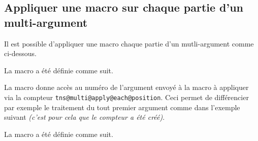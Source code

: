 \documentclass[12pt,a4paper]{article}
\begin{document}

\subsection{Appliquer une macro sur chaque partie d'un \og multi-argument \fg}


Il est possible d'appliquer une macro chaque partie d'un mutli-argument comme ci-dessous.

\makeatletter
\newcommand\decoone[1]{%
    [(\textbf{#1})] \quad%
}

\newcommand\multiapply[1]{%
    \tns@multi@apply@each{\decoone}{#1}
}
\makeatother

\begin{latexex}
\multiapply{1|2|3}
\end{latexex}

La macro  a été définie comme suit.

\begin{latexex-alone}
\newcommand\decoone[1]{%
    [(\textbf{#1})] \quad%
}

\newcommand\multiapply[1]{%
    \tns@multi@apply@each{\decoone}{#1}
}
\end{latexex-alone}





La macro  donne accès au numéro de l'argument envoyé à la macro à appliquer via la compteur \verb#tns@multi@apply@each@position#.
Ceci permet de différencier par exemple le traitement du tout premier argument comme dans l'exemple suivant \emph{(c'est pour cela que le compteur a été créé)}.

\makeatletter
\newcommand\decoafterfirst[1]{%
    \ifnum\value{tns@multi@apply@each@position}=1
        #1:%
    \else%
        << #1 >> \quad%
    \fi%
}

\newcommand\multiapplyafterone[1]{%
    \tns@multi@apply@each{\decoafterfirst}{#1}
}
\makeatother

\begin{latexex}
\multiapplyafterone{1|2|3}
\end{latexex}

La macro  a été définie comme suit.
\end{document}

